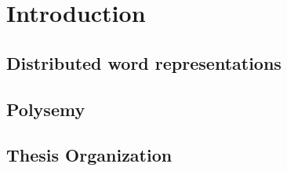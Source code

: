 \chapter{Introduction}
\label{cha:intro}



\section{Distributed word representations}


\section{Polysemy}

\section{Thesis Organization}